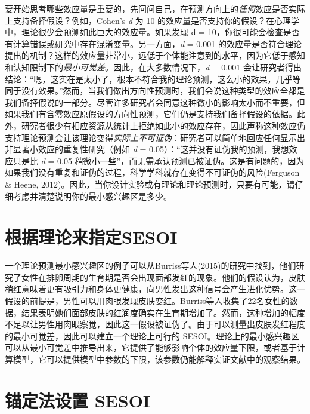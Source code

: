 \documentclass[
  letterpaper,
  DIV=11,
  numbers=noendperiod]{scrreprt}
\begin{document}
要开始思考哪些效应量是重要的，先问问自己，在预测方向上的\emph{任何}效应是否实际上支持备择假设？例如，Cohen's
\emph{d} 为 10
的效应量是否支持你的假设？在心理学中，理论很少会预测如此巨大的效应量。如果发现
d =
10，你很可能会检查是否有计算错误或研究中存在混淆变量。另一方面，\emph{d}
= 0.001
的效应量是否符合理论提出的机制？这样的效应量非常小，远低于个体能注意到的水平，因为它低于感知和认知限制下的\emph{最小可觉差}。因此，在大多数情况下，\emph{d}
= 0.001
会让研究者得出结论：``嗯，这实在是太小了，根本不符合我的理论预测，这么小的效果，几乎等同于没有效果。''然而，当我们做出方向性预测时，我们会说这种类型的效应全都是我们备择假说的一部分。尽管许多研究者会同意这种微小的影响太小而不重要，但如果我们有含零效应原假设的方向性预测，它们仍是支持我们备择假设的依据。此外，研究者很少有相应资源从统计上拒绝如此小的效应存在，因此声称这种效应仍支持理论预测会让该理论变得\emph{实际上不可证伪}：研究者可以简单地回应任何显示出非显著小效应的重复性研究（例如
\emph{d} = 0.05）：``这并没有证伪我的预测，我想效应只是比 \emph{d} =
0.05
稍微小一些''，而无需承认预测已被证伪。这是有问题的，因为如果我们没有重复和证伪的过程，科学学科就存在变得不可证伪的风险(Ferguson
\& Heene,
2012)。因此，当你设计实验或有理论和理论预测时，只要有可能，请仔细考虑并清楚说明你的最小感兴趣区是多少。

\hypertarget{ux6839ux636eux7406ux8bbaux6765ux6307ux5b9asesoi}{%
\section{根据理论来指定SESOI}\label{ux6839ux636eux7406ux8bbaux6765ux6307ux5b9asesoi}}

一个理论预测最小感兴趣区的例子可以从Burriss等人(2015)的研究中找到，他们研究了女性在排卵周期的生育期是否会出现面部发红的现象。他们的假设认为，皮肤稍红意味着更有吸引力和身体更健康，向男性发出这种信号会产生进化优势。这一假设的前提是，男性可以用肉眼发现皮肤变红。Burriss等人收集了22名女性的数据，结果表明她们面部皮肤的红润度确实在生育期增加了。然而，这种增加的幅度不足以让男性用肉眼察觉，因此这一假设被证伪了。由于可以测量出皮肤发红程度的最小可觉差，因此可以建立一个理论上可行的
SESOI。理论上的最小感兴趣区可以从最小可觉差中推导出来，它提供了能够影响个体的效应量下限，或者基于计算模型，它可以提供模型中参数的下限，该参数仍能解释实证文献中的观察结果。

\hypertarget{ux951aux5b9aux6cd5ux8bbeux7f6e-sesoi}{%
\section{锚定法设置 SESOI}\label{ux951aux5b9aux6cd5ux8bbeux7f6e-sesoi}}
\end{document}
